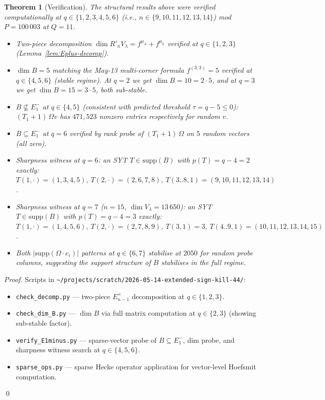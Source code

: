 \documentclass[11pt]{article}
\newtheorem{theorem}{Theorem}
\theoremstyle{definition}
\newcommand{\Om}{\Omega}
\newcommand{\supp}{\mathrm{supp}}
\newcommand{\Rp}{{R'}}
\begin{document}
\begin{theorem}[Verification]\label{thm:verify}
The structural results above were verified computationally at
$q \in \{1, 2, 3, 4, 5, 6\}$ (i.e., $n \in \{9, 10, 11, 12, 13, 14\}$)
mod $P = 100\,003$ at $Q = 11$.
\begin{itemize}[topsep=0.3em,itemsep=0.1em]
\item Two-piece decomposition $\dim \Rp_n V_\lambda = f^{\mu_A} +
   f^{\mu_h}$ verified at $q \in \{1, 2, 3\}$
   (Lemma~\ref{lem:Eplus-decomp}).
\item $\dim B = 5$ matching the May-13 multi-corner formula
   $f^{(3, 3)} = 5$ verified at $q \in \{4, 5, 6\}$ (stable regime).
   At $q = 2$ we get $\dim B = 10 = 2{\cdot}5$, and at $q = 3$ we get
   $\dim B = 15 = 3{\cdot}5$, both sub-stable.
\item $B \not\subseteq E_1^-$ at $q \in \{4, 5\}$
   (consistent with predicted threshold $\tau = q - 5 \le 0$):
   $(T_1+1)\,\Om v$ has $471, 523$ nonzero entries respectively for
   random $v$.
\item $B \subseteq E_1^-$ at $q = 6$ verified by rank probe of
   $(T_1+1)\,\Om$ on $5$ random vectors (all zero).
\item Sharpness witness at $q = 6$: an SYT $T \in \supp(B)$ with
   $p(T) = q - 4 = 2$ exactly:
   $T(1, \cdot) = (1, 3, 4, 5),\ T(2, \cdot) = (2, 6, 7, 8),\
   T(3..8, 1) = (9, 10, 11, 12, 13, 14)$.
\item Sharpness witness at $q = 7$ ($n = 15$, $\dim V_\lambda = 13\,650$):
   an SYT $T \in \supp(B)$ with $p(T) = q - 4 = 3$ exactly:
   $T(1, \cdot) = (1, 4, 5, 6),\ T(2, \cdot) = (2, 7, 8, 9),\
   T(3, 1) = 3,\ T(4..9, 1) = (10, 11, 12, 13, 14, 15)$.
\item Both $|\supp(\Om \cdot e_i)|$ patterns at $q \in \{6, 7\}$
   stabilise at $2050$ for random probe columns, suggesting the support
   structure of $B$ stabilises in the full regime.
\end{itemize}
\end{theorem}

\begin{proof}
Scripts in \texttt{\textasciitilde/projects/scratch/2026-05-14-extended-sign-kill-44/}:
\begin{itemize}[topsep=0.3em,itemsep=0.1em,leftmargin=2em]
\item \texttt{check\_decomp.py} --- two-piece $E_{n-1}^+$
   decomposition at $q \in \{1, 2, 3\}$.
\item \texttt{check\_dim\_B.py} --- $\dim B$ via full matrix
   computation at $q \in \{2, 3\}$ (showing sub-stable factor).
\item \texttt{verify\_E1minus.py} --- sparse-vector probe of
   $B \subseteq E_1^-$, dim probe, and sharpness witness search
   at $q \in \{4, 5, 6\}$.
\item \texttt{sparse\_ops.py} --- sparse Hecke operator application
   for vector-level Hoefsmit computation.
\end{itemize}
\qed
\end{proof}
\end{document}
